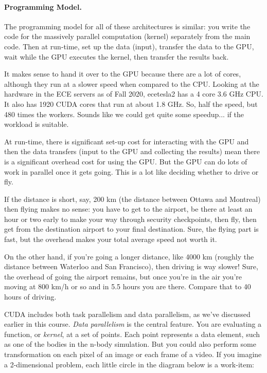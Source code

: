 \documentclass[a4paper]{report}
\begin{document}
\paragraph{Programming Model.} The programming
model for all of these architectures is similar: you write the code for
the massively parallel computation (kernel) separately from the main
code. Then at run-time, set up the data (input), transfer the data to the GPU, wait while the GPU executes the kernel, then transfer the results back. 

It makes sense to hand it over to the GPU because there are a lot of cores, although they run at a slower speed when compared to the CPU. Looking at the hardware in the ECE servers as of Fall 2020, ecetesla2 has a 4 core 3.6 GHz CPU. It also has 1920 CUDA cores that run at about 1.8 GHz. So, half the speed, but 480 times the workers. Sounds like we could get quite some speedup... if the workload is suitable.

At run-time, there is significant set-up cost for interacting with the GPU and then the data transfers (input to the GPU and collecting the results) mean there is a significant overhead cost for using the GPU. But the GPU can do lots of work in parallel once it gets going. This is a lot like deciding whether to drive or fly. 

If the distance is short, say, 200 km (the distance between Ottawa and Montreal) then flying makes no sense: you have to get to the airport, be there at least an hour or two early to make your way through security checkpoints, then fly, then get from the destination airport to your final destination. Sure, the flying part is fast, but the overhead makes your total average speed not worth it.

On the other hand, if you're going a longer distance, like 4000 km (roughly the distance between Waterloo and San Francisco), then driving is way slower! Sure, the overhead of going the airport remains, but once you're in the air you're moving at 800 km/h or so and in 5.5 hours you are there. Compare that to 40 hours of driving.

CUDA includes both task parallelism and data parallelism, as we've
discussed earlier in this course. \emph{Data parallelism} is the central
feature. You are evaluating a function, or \emph{kernel},
at a set of points. Each point represents a data element, such as one of the
bodies in the n-body simulation. But you could also perform some 
transformation on each pixel of an image or each frame of a video. If you 
imagine a 2-dimensional problem, each little circle in the diagram below is
a work-item:
\end{document}
